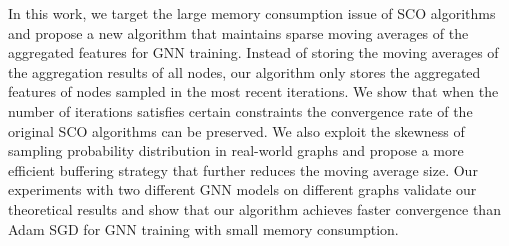 In this work, we target the large memory consumption issue of SCO algorithms and propose a new algorithm that maintains sparse moving averages of the aggregated features for GNN training. 
Instead of storing the moving averages of the aggregation results of all nodes, our algorithm only stores the aggregated features of nodes sampled in the most recent iterations. 
We show that when the number of iterations satisfies certain constraints the convergence rate of the original SCO algorithms can be preserved. 
We also exploit the skewness of sampling probability distribution in real-world graphs and propose a more efficient buffering strategy that further reduces the moving average size. 
Our experiments with two different GNN models on different graphs validate our theoretical results and show that our algorithm achieves faster convergence than Adam SGD for GNN training with small memory consumption. 





















